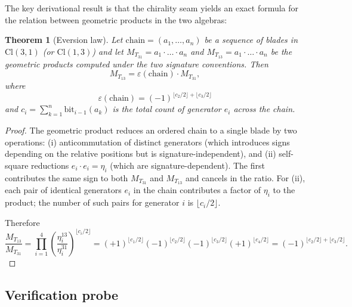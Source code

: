 \documentclass[11pt,a4paper]{article}
\theoremstyle{plain}
\newtheorem{theorem}{Theorem}[section]
\theoremstyle{definition}
\theoremstyle{remark}
\numberwithin{equation}{section}
\providecommand{\Cl}{\mathrm{Cl}}
\providecommand{\eps}{\varepsilon}
\begin{document}
The key derivational result is that the chirality seam yields an
exact formula for the relation between geometric products in the two
algebras:

\begin{theorem}[Eversion law]\label{thm:eversion}
Let $\mathrm{chain} = (a_1, \ldots, a_n)$ be a sequence of blades
in $\Cl(3,1)$ (or $\Cl(1,3)$) and let
$M_{T_{31}} = a_1 \cdot \ldots \cdot a_n$ and
$M_{T_{13}} = a_1 \cdot \ldots \cdot a_n$
be the geometric products computed under the two signature
conventions.  Then
\begin{equation}\label{eq:eversion}
  M_{T_{13}} = \eps(\mathrm{chain}) \cdot M_{T_{31}},
\end{equation}
where
\begin{equation}\label{eq:epsilon}
  \eps(\mathrm{chain})
  = (-1)^{\lfloor c_2/2 \rfloor + \lfloor c_3/2 \rfloor}
\end{equation}
and $c_i = \sum_{k=1}^{n} \mathrm{bit}_{i-1}(a_k)$ is the total
count of generator $e_i$ across the chain.
\end{theorem}

\begin{proof}
The geometric product reduces an ordered chain to a single blade by
two operations: (i) anticommutation of distinct generators (which
introduces signs depending on the relative positions but is
signature-independent), and (ii) self-square reductions $e_i \cdot
e_i = \eta_i$ (which are signature-dependent).  The first
contributes the same sign to both $M_{T_{31}}$ and $M_{T_{13}}$ and
cancels in the ratio.  For (ii), each pair of identical generators
$e_i$ in the chain contributes a factor of $\eta_i$ to the product;
the number of such pairs for generator $i$ is $\lfloor c_i / 2
\rfloor$.

Therefore
\[
  \frac{M_{T_{13}}}{M_{T_{31}}}
  = \prod_{i=1}^4 \left(\frac{\eta_i^{13}}{\eta_i^{31}}\right)^{\lfloor c_i / 2 \rfloor}
  = (+1)^{\lfloor c_1 / 2 \rfloor}
    (-1)^{\lfloor c_2 / 2 \rfloor}
    (-1)^{\lfloor c_3 / 2 \rfloor}
    (+1)^{\lfloor c_4 / 2 \rfloor}
  = (-1)^{\lfloor c_2 / 2 \rfloor + \lfloor c_3 / 2 \rfloor}.
\]
\end{proof}

\subsection{Verification probe}
\end{document}
